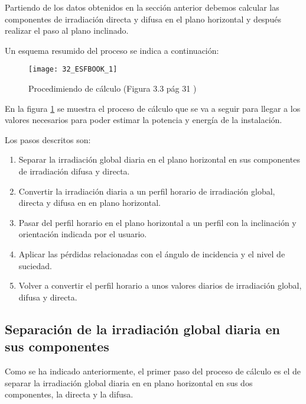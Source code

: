 Partiendo de los datos obtenidos en la sección anterior debemos calcular las componentes de irradiación directa y difusa en el plano horizontal y después realizar el paso al plano inclinado.

Un esquema resumido del proceso se indica a continuación:

\begin{figure}[ht]
\texttt{[image: 32\_ESFBOOK\_1]}
\centering
\caption{Procedimiendo de cálculo (Figura 3.3 pág 31 \cite{esf_book})}
\label{fig:fig_1}
\end{figure}

En la figura \ref{fig:fig_1} se muestra el proceso de cálculo que se va a seguir para llegar a los valores necesarios para poder estimar la potencia y energía de la instalación.

Los pasos descritos son:
\begin{enumerate}
	\item Separar la irradiación global diaria en el plano horizontal en sus componentes de irradiación difusa y directa.
	\item Convertir la irradiación diaria a un perfil horario de irradiación global, directa y difusa en en plano horizontal.
	\item Pasar del perfil horario en el plano horizontal a un perfil con la inclinación y orientación indicada por el usuario.
	\item Aplicar las pérdidas relacionadas con el ángulo de incidencia y el nivel de suciedad.
	\item Volver a convertir el perfil horario a unos valores diarios de irradiación global, difusa y directa.
\end{enumerate}

\subsection{Separación de la irradiación global diaria en sus componentes}

Como se ha indicado anteriormente, el primer paso del proceso de cálculo es el de separar la irradiación global diaria en en plano horizontal en sus dos componentes, la directa y la difusa.

















